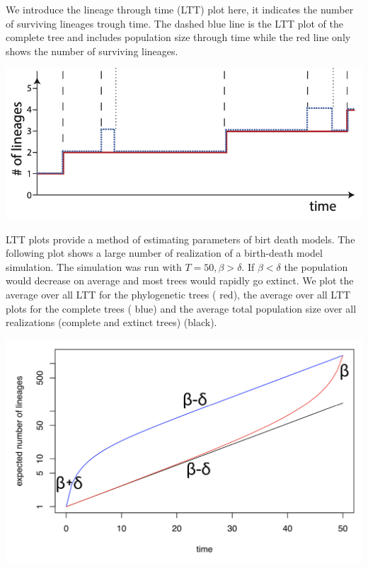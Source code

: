 \documentclass{article}
\begin{document}
\begin{multicols*}{3}
We introduce the lineage through time (LTT) plot here, it indicates the number of surviving lineages trough time. The dashed blue line is the LTT plot of the complete tree and includes population size through time while the red line only shows the number of surviving lineages. 

\begin{center}
    \includegraphics[width=0.8\linewidth, angle=0.0]{ltt.png}
\end{center}

LTT plots provide a method of estimating parameters of birt death models. The following plot shows a large number of realization of a birth-death model simulation. The simulation was run with $T = 50, \beta > \delta$. If $\beta < \delta$ the population would decrease on average and most trees would rapidly go extinct. We plot the average over all LTT for the phylogenetic trees ({\color{red} red}), the average over all LTT plots for the complete trees ({\color{blue} blue}) and the average total population size over all realizations (complete and extinct trees) (black).

\begin{center}
    \includegraphics[width=1\linewidth, angle=0.0]{lttavg.png}
\end{center}


\end{multicols*}
\end{document}
